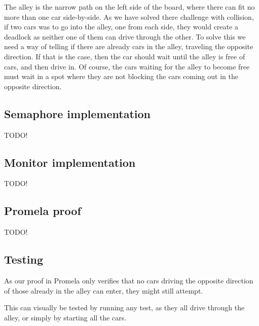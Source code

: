 
The alley is the narrow path on the left side of the board, where
there can fit no more than one car side-by-side. As we have solved
there challenge with collision, if two cars was to go into the alley,
one from each side, they would create a deadlock as neither one of
them can drive through the other. To solve this we need a way of
telling if there are already cars in the alley, traveling the opposite
direction. If that is the case, then the car should wait until the
alley is free of cars, and then drive in. Of course, the cars waiting
for the alley to become free must wait in a spot where they are not
blocking the cars coming out in the opposite direction.


\subsection{Semaphore implementation}
\label{sub:all-sema}
TODO!

\subsection{Monitor implementation}
\label{sub:all-moni}
TODO!

\subsection{Promela proof}
\label{sub:all-proof}
TODO!

\subsection{Testing}
\label{sub:all-test}
As our proof in Promela only verifies that no cars driving the
opposite direction of those already in the alley can enter, they might
still attempt.

This can visually be tested by running any test, as they all drive through
the alley, or simply by starting all the cars.
